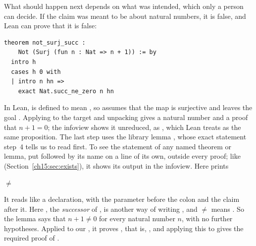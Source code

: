 What should happen next depends on what was intended, which only a person can decide. If the claim was meant to be about natural numbers, it is false, and Lean can prove that it is false:
\par\noindent\begin{minipage}{\linewidth}
\begin{lstlisting}
theorem not_surj_succ :
    Not (Surj (fun n : Nat => n + 1)) := by
  intro h
  cases h 0 with
  | intro n hn =>
    exact Nat.succ_ne_zero n hn
\end{lstlisting}
\end{minipage}\par
In Lean,  is defined to mean , so  assumes that the map is surjective and leaves the goal . Applying  to the target  and unpacking gives a natural number  and a proof  that $n+1=0$; the infoview shows it unreduced, as , which Lean treats as the same proposition. The last step uses the library lemma , whose exact statement step~4 tells us to read first. To see the statement of any named theorem or lemma, put  followed by its name on a line of its own, outside every proof; like  (Section~\ref{ch15:sec:exists}), it shows its output in the infoview. Here  prints
\begin{center}
 $\ne$ 
\end{center}
It reads like a declaration, with the parameter  before the colon and the claim after it. Here , the \emph{successor} of , is another way of writing , and  $\ne$  means . So the lemma says that $n+1\ne0$ for every natural number $n$, with no further hypotheses. Applied to our , it proves , that is, , and applying this to  gives the required proof of .

